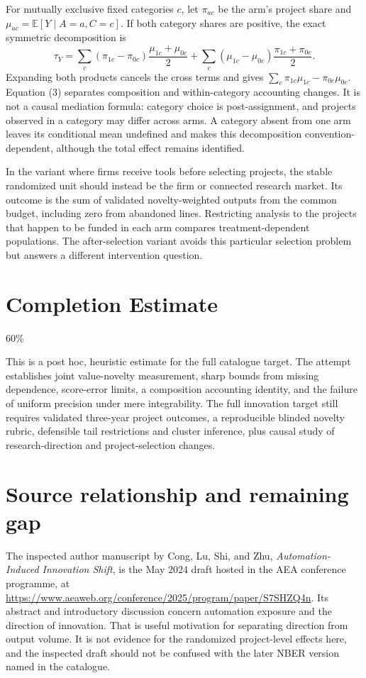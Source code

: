 \documentclass[11pt]{article}
\newcommand{\E}{\mathbb E}
\begin{document}
For mutually exclusive fixed categories $c$, let $\pi_{ac}$ be the arm's project share and $\mu_{ac}=\E[Y\mid A=a,C=c]$. If both category shares are positive, the exact symmetric decomposition is
\[
 \tau_Y=\sum_c (\pi_{1c}-\pi_{0c})\frac{\mu_{1c}+\mu_{0c}}2
       +\sum_c (\mu_{1c}-\mu_{0c})\frac{\pi_{1c}+\pi_{0c}}2.       \tag{3}
\]
Expanding both products cancels the cross terms and gives $\sum_c\pi_{1c}\mu_{1c}-\pi_{0c}\mu_{0c}$. Equation (3) separates composition and within-category accounting changes. It is not a causal mediation formula: category choice is post-assignment, and projects observed in a category may differ across arms. A category absent from one arm leaves its conditional mean undefined and makes this decomposition convention-dependent, although the total effect remains identified.

In the variant where firms receive tools before selecting projects, the stable randomized unit should instead be the firm or connected research market. Its outcome is the sum of validated novelty-weighted outputs from the common budget, including zero from abandoned lines. Restricting analysis to the projects that happen to be funded in each arm compares treatment-dependent populations. The after-selection variant avoids this particular selection problem but answers a different intervention question.

\section{Completion Estimate}
60\%

This is a post hoc, heuristic estimate for the full catalogue target.
The attempt establishes joint value-novelty measurement, sharp bounds from missing dependence, score-error limits, a composition accounting identity, and the failure of uniform precision under mere integrability. The full innovation target still requires validated three-year project outcomes, a reproducible blinded novelty rubric, defensible tail restrictions and cluster inference, plus causal study of research-direction and project-selection changes.

\section*{Source relationship and remaining gap}
The inspected author manuscript by Cong, Lu, Shi, and Zhu, \emph{Automation-Induced Innovation Shift}, is the May 2024 draft hosted in the AEA conference programme, at
\url{https://www.aeaweb.org/conference/2025/program/paper/S7SHZQ4n}.
Its abstract and introductory discussion concern automation exposure and the direction of innovation. That is useful motivation for separating direction from output volume. It is not evidence for the randomized project-level effects here, and the inspected draft should not be confused with the later NBER version named in the catalogue.
\end{document}
